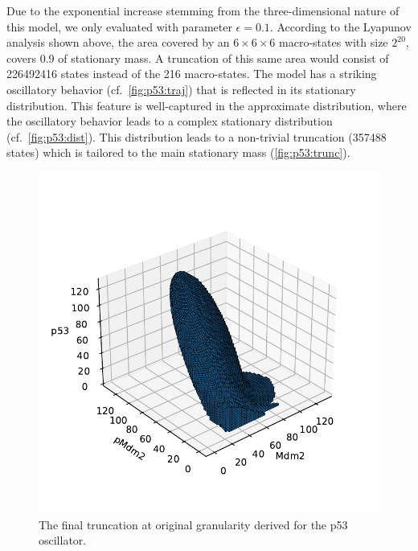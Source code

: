 Due to the exponential increase stemming from the three-di\-men\-sion\-al nature of this model, we only evaluated with parameter $\epsilon=0.1$.
According to the Lyapunov analysis shown above, the area covered by an $6\times 6\times 6$ macro-states with size $2^{20}$, covers \num{0.9} of stationary mass.
A truncation of this same area would consist of \num{226492416} states instead of the \num{216} macro-states.
The model has a striking oscillatory behavior (cf.\ \autoref{fig:p53:traj}) that is reflected in its stationary distribution.
This feature is well-captured in the approximate distribution, where the oscillatory behavior leads to a complex stationary distribution (cf.\ \autoref{fig:p53:dist}).
This distribution leads to a non-trivial truncation (\num{357488} states) which is tailored to the main stationary mass (\autoref{fig:p53:trunc}).
\begin{figure}[htb]
    \centering
    \begin{minipage}{0.9\textwidth}
    \centering
    \includegraphics[width=\textwidth]{gfx/trunc_p53.pdf}
    \end{minipage}
\caption{The final truncation at original granularity derived for the p53 oscillator.}
\label{fig:p53:trunc}
\end{figure}
